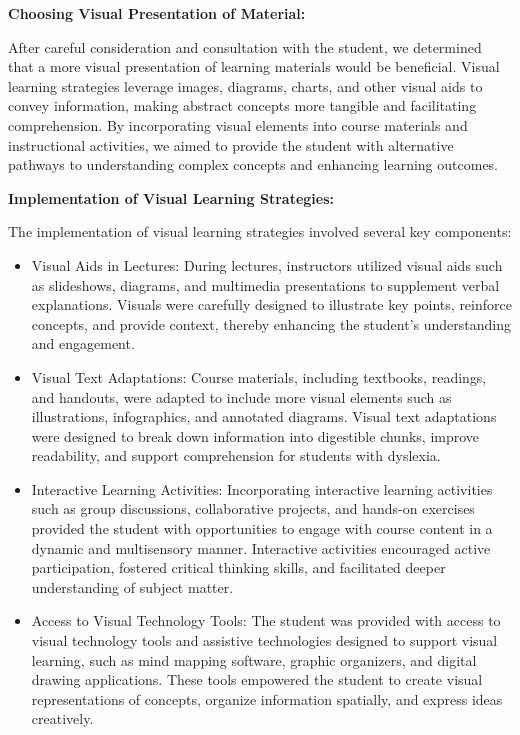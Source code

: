 \documentclass[a4paper,12pt]{article}
\begin{document}
\begin{large}
\textbf{Choosing Visual Presentation of Material:}

After careful consideration and consultation with the student, we determined that a more visual presentation of learning materials would be beneficial. Visual learning strategies leverage images, diagrams, charts, and other visual aids to convey information, making abstract concepts more tangible and facilitating comprehension. By incorporating visual elements into course materials and instructional activities, we aimed to provide the student with alternative pathways to understanding complex concepts and enhancing learning outcomes.

\textbf{Implementation of Visual Learning Strategies:}

The implementation of visual learning strategies involved several key components:

\begin{itemize}
\item Visual Aids in Lectures: During lectures, instructors utilized visual aids such as slideshows, diagrams, and multimedia presentations to supplement verbal explanations. Visuals were carefully designed to illustrate key points, reinforce concepts, and provide context, thereby enhancing the student's understanding and engagement.

\item Visual Text Adaptations: Course materials, including textbooks, readings, and handouts, were adapted to include more visual elements such as illustrations, infographics, and annotated diagrams. Visual text adaptations were designed to break down information into digestible chunks, improve readability, and support comprehension for students with dyslexia.

\item Interactive Learning Activities: Incorporating interactive learning activities such as group discussions, collaborative projects, and hands-on exercises provided the student with opportunities to engage with course content in a dynamic and multisensory manner. Interactive activities encouraged active participation, fostered critical thinking skills, and facilitated deeper understanding of subject matter.

\item Access to Visual Technology Tools: The student was provided with access to visual technology tools and assistive technologies designed to support visual learning, such as mind mapping software, graphic organizers, and digital drawing applications. These tools empowered the student to create visual representations of concepts, organize information spatially, and express ideas creatively.
    

\end{itemize}
\end{large}
\end{document}
